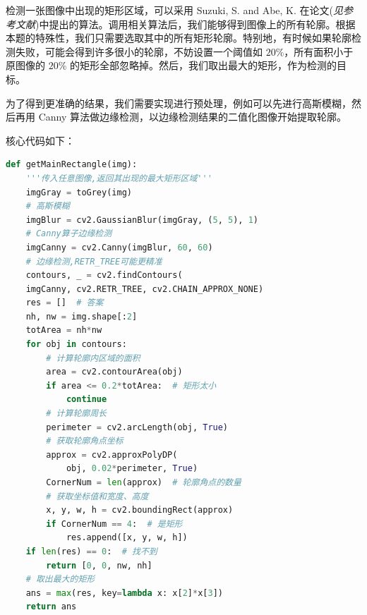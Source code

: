 \documentclass{ctexart}
\begin{document}

检测一张图像中出现的矩形区域，可以采用 Suzuki, S. and Abe, K. 在论文(\textit{见参考文献})中提出的算法。调用相关算法后，我们能够得到图像上的所有轮廓。根据本题的特殊性，我们只需要选取其中的所有矩形轮廓。特别地，有时候如果轮廓检测失败，可能会得到许多很小的轮廓，不妨设置一个阈值如 $20\%$，所有面积小于原图像的 $20\%$ 的矩形全部忽略掉。然后，我们取出最大的矩形，作为检测的目标。

为了得到更准确的结果，我们需要实现进行预处理，例如可以先进行高斯模糊，然后再用 Canny 算法做边缘检测，以边缘检测结果的二值化图像开始提取轮廓。

核心代码如下：

\begin{lstlisting}[language=python]
def getMainRectangle(img):
    '''传入任意图像,返回其出现的最大矩形区域'''
    imgGray = toGrey(img)
    # 高斯模糊
    imgBlur = cv2.GaussianBlur(imgGray, (5, 5), 1)
    # Canny算子边缘检测
    imgCanny = cv2.Canny(imgBlur, 60, 60)
    # 边缘检测,RETR_TREE可能更精准
    contours, _ = cv2.findContours(
    imgCanny, cv2.RETR_TREE, cv2.CHAIN_APPROX_NONE)
    res = []  # 答案
    nh, nw = img.shape[:2]
    totArea = nh*nw
    for obj in contours:
        # 计算轮廓内区域的面积
        area = cv2.contourArea(obj)
        if area <= 0.2*totArea:  # 矩形太小
            continue
        # 计算轮廓周长
        perimeter = cv2.arcLength(obj, True)
        # 获取轮廓角点坐标
        approx = cv2.approxPolyDP(
            obj, 0.02*perimeter, True)
        CornerNum = len(approx)  # 轮廓角点的数量
        # 获取坐标值和宽度、高度
        x, y, w, h = cv2.boundingRect(approx)
        if CornerNum == 4:  # 是矩形
            res.append([x, y, w, h])
    if len(res) == 0:  # 找不到
        return [0, 0, nw, nh]
    # 取出最大的矩形
    ans = max(res, key=lambda x: x[2]*x[3])  
    return ans
\end{lstlisting}
\end{document}
